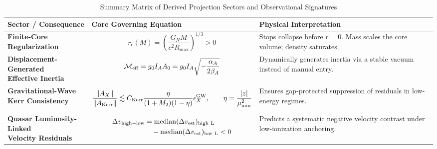 \documentclass[11pt]{article}
\newcommand{\Kerr}{\mathrm{Kerr}}
\begin{document}
\begin{table}[ht!]
\centering
\caption{Summary Matrix of Derived Projection Sectors and Observational Signatures}
\label{tab:projection_summary}
\small
\begin{tabular}{p{3.8cm} p{6.2cm} p{5.5cm}}
\hline
\textbf{Sector / Consequence} & \textbf{Core Governing Equation} & \textbf{Physical Interpretation} \\ \hline
\raggedright \textbf{Finite-Core\\Regularization} & 
\vspace{-1em} \begin{equation*} r_c(M) = \left( \frac{G_NM}{c^2R_{\max}} \right)^{1/3} >0 \end{equation*} & 
Stops collapse before $r=0$. Mass scales the core volume; density saturates. \\ \hline

\raggedright \textbf{Displacement-Generated\\Effective Inertia} & 
\vspace{-1em} \begin{equation*} \mathcal M_{\rm eff} = g_0I_AA_0 = g_0I_A\sqrt{- \frac{\alpha_A}{2\beta_A}} \end{equation*} & 
Dynamically generates inertia via a stable vacuum instead of manual entry. \\ \hline

\raggedright \textbf{Gravitational-Wave\\Kerr Consistency} & 
\vspace{-1em} \begin{equation*} \frac{\|A_X\|}{\|A_{\rm Kerr}\|} \lesssim C_{\rm Kerr} \frac{\eta}{(1+M_2)(1-\eta)} \epsilon_X^{\rm GW}, \qquad \eta=\frac{|z|}{\mu_{\min}^2} \end{equation*} & 
Ensures gap-protected suppression of residuals in low-energy regimes. \\ \hline

\raggedright \textbf{Quasar Luminosity-Linked\\Velocity Residuals} & 
\vspace{-1.2em} \begin{equation*} 
\begin{aligned}
\Delta v_{\rm high-low} &= {\rm median}(\Delta v_{\rm est})_{\rm high\ L} \\
&\quad - {\rm median}(\Delta v_{\rm est})_{\rm low\ L} < 0
\end{aligned}
\end{equation*} & 
Predicts a systematic negative velocity contrast under low-ionization anchoring. \\ \hline


\end{tabular}
\end{table}
\end{document}
